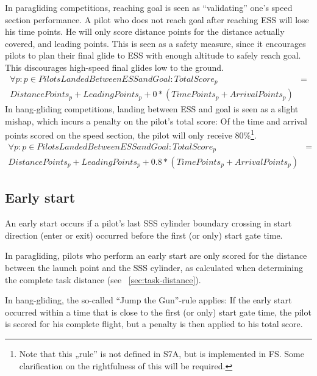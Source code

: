 \documentclass{article}
\begin{document}
In paragliding competitions, reaching goal is seen as “validating” one’s speed
section performance. A pilot who does not reach goal after reaching ESS will
lose his time points. He will only score distance points for the distance
actually covered, and leading points. This is seen as a safety measure, since
it encourages pilots to plan their final glide to ESS with enough altitude to
safely reach goal. This discourages high-speed final glides low to the ground.
\begin{align*}
    \forall p : p \in PilotsLandedBetweenESSandGoal : TotalScore_p &= \\
    DistancePoints_p + LeadingPoints_p + 0 * (TimePoints_p + ArrivalPoints_p)
\end{align*}
In hang-gliding competitions, landing between ESS and goal is seen as a slight
mishap, which incurs a penalty on the pilot’s total score: Of the time and
arrival points scored on the speed section, the pilot will only receive
80\%\footnote{Note that this „rule” is not defined in S7A, but is implemented
in FS. Some clarification on the rightfulness of this will be required.}.
\begin{align*}
    \forall p : p \in PilotsLandedBetweenESSandGoal : TotalScore_p &= \\
    DistancePoints_p + LeadingPoints_p + 0.8 * (TimePoints_p + ArrivalPoints_p)
\end{align*}

\subsection{Early start}
An early start occurs if a pilot’s last SSS cylinder boundary crossing in start
direction (enter or exit) occurred before the first (or only) start gate time.

In paragliding, pilots who perform an early start are only scored for the
distance between the launch point and the SSS cylinder, as calculated when
determining the complete task distance (see ~\ref{sec:task-distance}).

In hang-gliding, the so-called “Jump the Gun”-rule applies: If the early start
occurred within a time that is close to the first (or only) start gate time,
the pilot is scored for his complete flight, but a penalty is then applied to
his total score.
\end{document}
